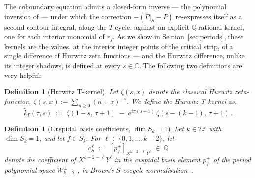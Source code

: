 \documentclass[11pt]{article}
\newtheorem{definition}[theorem]{Definition}
\numberwithin{equation}{section}  %
\newcommand{\ZZ}{\mathbb{Z}}
\newcommand{\QQ}{\mathbb{Q}}
\newcommand{\CC}{\mathbb{C}}
\begin{document}
The coboundary equation admits a closed-form inverse --- the polynomial
inversion of \cite{DR2017} --- under which the correction $-(P|_S - P)$
re-expresses itself as a second contour integral, along the $T$-cycle,
against an explicit $\QQ$-rational kernel, one for each interior monomial
of $r_f$.  As we show in Section~\ref{sec:periods}, these kernels are
the values, at the interior integer points of the critical strip, of a
single difference of Hurwitz zeta functions --- and the Hurwitz
difference, unlike its integer shadows, is defined at every
$s \in \CC$. The following two definitions are very helpful:
\begin{definition}[Hurwitz T-kernel]\label{def:HurwitzT}
Let $\zeta(s, x)$ denote the classical Hurwitz zeta-function, $\zeta(s,x):= \sum_{n \geq 0} (n+x)^{-s}$. We define the \emph{Hurwitz T-kernel} as,
\begin{equation}\label{eq:tildekT-def}
  \widetilde{k}_T(\tau, s)
  \;:=\; \zeta(1 - s,\, \tau + 1)
  \;-\; e^{i\pi(s-1)}\,\zeta(s - (k - 1),\, \tau + 1)~.
\end{equation}
\end{definition}
 
\begin{definition}[Cuspidal basis coefficients, $\dim S_k = 1$]\label{def:poly-coeffs-dimSk1} 
Let $k \in 2\ZZ$ with $\dim S_k = 1$, and let $f \in S_k^!$.  For
$\ell \in \{0, 1, \ldots, k - 2\}$, let
\begin{equation}\label{eq:cS-def}
  c_S^{\,\ell} \;:=\; [p_f^\pm]_{X^{k-2-\ell}\,Y^{\ell}} \;\in\; \QQ
\end{equation}
denote the coefficient of $X^{k-2-\ell}Y^{\ell}$ in the cuspidal basis
element $p_f^\pm$ of the period polynomial space $W_{k-2}^\pm$
\cite{KZ1984}, in Brown's $S$-cocycle normalisation~\cite{Brown2017}. 
\end{definition}
 
\end{document}
